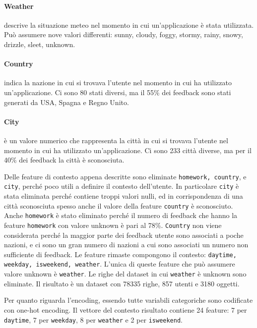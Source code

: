 \documentclass[12pt,italian]{report}
\begin{document}
\paragraph{Weather} descrive la situazione meteo nel momento in cui un'applicazione è stata utilizzata. Può assumere nove valori differenti: sunny, cloudy, foggy, stormy, rainy, snowy, drizzle, sleet, unknown.

\paragraph{Country} indica la nazione in cui si trovava l'utente nel momento in cui ha utilizzato un'applicazione. Ci sono 80 stati diversi, ma il 55\% dei feedback sono stati generati da USA, Spagna e Regno Unito.

\paragraph{City} è un valore numerico che rappresenta la città in cui si trovava l'utente nel momento in cui ha utilizzato un'applicazione. Ci sono 233 città diverse, ma per il 40\% dei feedback la città è sconosciuta.  

\bigskip \noindent
Delle feature di contesto appena descritte sono eliminate \texttt{homework, country}, e \texttt{city}, perché poco utili a definire il contesto dell'utente. In particolare \texttt{city} è stata eliminata perché contiene troppi valori nulli, ed in corrispondenza di una città sconosciuta spesso anche il valore della feature \texttt{country} è sconosciuto. Anche \texttt{homework} è stato eliminato perché il numero di feedback che hanno la feature \texttt{homework} con valore unknown è pari al 78\%. \texttt{Country} non viene considerata perché la maggior parte dei feedback utente sono associati a poche nazioni, e ci sono un gran numero di nazioni a cui sono associati un numero non sufficiente di feedback.
Le feature rimaste compongono il contesto: \texttt{daytime, weekday, isweekend, weather}. L'unica di queste feature che può assumere valore unknown è \texttt{weather}. Le righe del dataset in cui \texttt{weather} è unknown sono eliminate. Il risultato è un dataset con 78335 righe, 857 utenti e 3180 oggetti.

Per quanto riguarda l'encoding, essendo tutte variabili categoriche sono codificate con one-hot encoding. Il vettore del contesto risultato contiene 24 feature: 7 per \texttt{daytime}, 7 per \texttt{weekday}, 8 per \texttt{weather} e 2 per \texttt{isweekend}.
\end{document}
